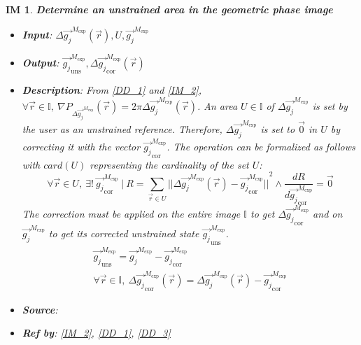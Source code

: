 \documentclass[12pt]{article}
\newtheorem{IM}{IM}
\begin{document}
\begin{IM}
\label{IM_3}
\noindent\colorbox{shadecolorIM}{\normalfont \textbf{Determine an unstrained 
area in the geometric phase image}}
\normalfont
\begin{itemize}
\item \textbf{Input}: $\Delta 
\overrightarrow{g_{j}}^{M_{\text{exp}}}(\vec{r}),U,\overrightarrow{g_{j}}^{M_{\text{exp}}}$
\item \textbf{Output}: $\overrightarrow{g_{j}}_{\text{uns}}^{M_{\text{exp}}}, 
\Delta\overrightarrow{g_{j}}_{\text{cor}}^{M_{\text{exp}}}(\vec{r})$
\item \textbf{Description}: From \cref{DD_1} and \cref{IM_2}, $\forall \vec{r} 
\in \mathbb{I},\  \nabla P_{\Delta \overrightarrow{g_{j}}^{M_{\text{exp}}}} 
(\vec{r}) = 2\pi \Delta \overrightarrow{g_{j}}^{M_{\text{exp}}}(\vec{r})$. An 
area $U \in \mathbb{I}$ of $\Delta \overrightarrow{g_{j}}^{M_{\text{exp}}}$ is 
set by the user as an unstrained reference. Therefore, $\Delta 
\overrightarrow{g_{j}}^{M_{\text{exp}}}$ is set to $\overrightarrow{0}$ in $U$ 
by correcting it with the vector 
$\overrightarrow{g_{j}}_{\text{cor}}^{M_{\text{exp}}}$. The operation can be 
formalized as follows with $card(U)$ representing the cardinality of the set 
$U$:
\begin{equation}
\forall \vec{r} \in U, \ \exists! \ 
\overrightarrow{g_{j}}_{\text{cor}}^{M_{\text{exp}}} \ | \ R=\sum_{\vec{r}\in 
U}{||\Delta 
\overrightarrow{g_{j}}^{M_{\text{exp}}}(\vec{r})-\overrightarrow{g_{j}}_{\text{cor}}^{M_{\text{exp}}}||}^{2} 
\wedge 
\frac{dR}{d\overrightarrow{g_{j}}_{\text{cor}}^{M_{\text{exp}}}}=\overrightarrow{0}
\end{equation}
The correction must be applied on the entire image $\mathbb{I}$ to get 
$\Delta\overrightarrow{g_{j}}_{\text{cor}}^{M_{\text{exp}}}$ and on 
$\overrightarrow{g_{j}}^{M_{\text{exp}}}$ to get its corrected unstrained state 
$\overrightarrow{g_{j}}_{\text{uns}}^{M_{\text{exp}}}$.
\begin{equation}
\begin{gathered}
\overrightarrow{g_{j}}_{\text{uns}}^{M_{\text{exp}}} = 
\overrightarrow{g_{j}}^{M_{\text{exp}}} 
-\overrightarrow{g_{j}}_{\text{cor}}^{M_{\text{exp}}} \\
\forall \vec{r} \in \mathbb{I}, \ 
\Delta\overrightarrow{g_{j}}_{\text{cor}}^{M_{\text{exp}}}(\vec{r})=\Delta 
\overrightarrow{g_{j}}^{M_{\text{exp}}}(\vec{r})-\overrightarrow{g_{j}}_{\text{cor}}^{M_{\text{exp}}}
\end{gathered}
\end{equation}
\item \textbf{Source}: \cite{Hytch1998}
\item \textbf{Ref by}: \cref{IM_2}, \cref{DD_1}, \cref{DD_3}
\end{itemize}
\end{IM}
\end{document}
